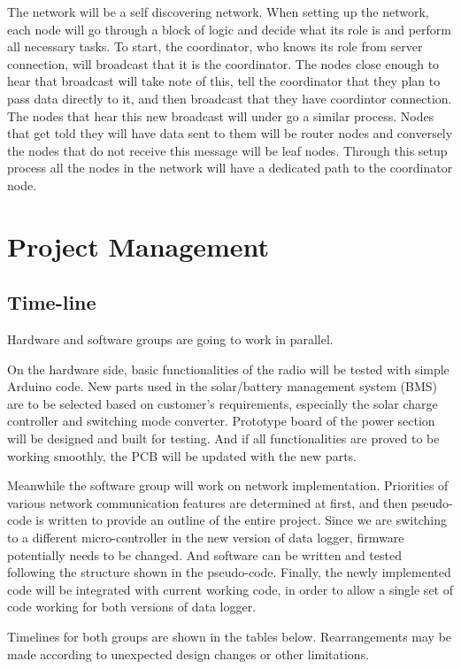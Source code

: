 \documentclass[12pt]{article}
\begin{document}
The network will be a self discovering network. When setting up the network, each node will go through a block of logic and decide what its role is and perform all necessary tasks. To start, the coordinator, who knows its role from server connection, will broadcast that it is the coordinator. The nodes close enough to hear that broadcast will take note of this, tell the coordinator that they plan to pass data directly to it, and then broadcast that they have coordintor connection. The nodes that hear this new broadcast will under go a similar process. Nodes that get told they will have data sent to them will be router nodes and conversely the nodes that do not receive this message will be leaf nodes. Through this setup process all the nodes in the network will have a dedicated path to the coordinator node. 

\section{Project Management}

\subsection{Time-line}
Hardware and software groups are going to work in parallel. 

On the hardware side, basic functionalities of the radio will be tested with simple Arduino code. New parts used in the solar/battery management system (BMS) are to be selected based on customer's requirements, especially the solar charge controller and switching mode converter. Prototype board of the power section will be designed and built for testing. And if all functionalities are proved to be working smoothly, the PCB will be updated with the new parts. 

Meanwhile the software group will work on network implementation. Priorities of various network communication features are determined at first, and then pseudo-code is written to provide an outline of the entire project. Since we are switching to a different micro-controller in the new version of data logger, firmware potentially needs to be changed. And software can be written and tested following the structure shown in the pseudo-code. Finally, the newly implemented code will be integrated with current working code, in order to allow a single set of code working for both versions of data logger. 

Timelines for both groups are shown in the tables below. Rearrangements may be made according to unexpected design changes or other limitations.
\end{document}

